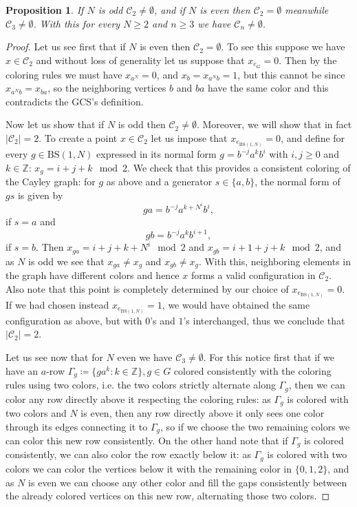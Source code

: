 \documentclass[letterpaper,10pt]{article}
\theoremstyle{plain}
\newtheorem{proposition}[theorem]{Proposition}
\newcommand{\BS}[1][N]{\mathrm{BS}(1,#1)}
\begin{document}
\begin{proposition}\label{prop.GCS_nonemptiness} If $N$ is odd $\mathcal{C}_2\neq \emptyset$, and if $N$ is even then $\mathcal{C}_2=\emptyset$ meanwhile $\mathcal{C}_3\neq \emptyset$. With this for every $N\ge 2$ and $n\ge 3$ we have $\mathcal{C}_n\neq \emptyset$.
\end{proposition}
\begin{proof}
	Let us see first that if $N$ is even then $\mathcal{C}_2=\emptyset$. To see this suppose we have $x\in \mathcal{C}_2$ and without loss of generality let us suppose that $x_{e_G}=0$. Then by the coloring rules we must have $x_{a^{N}}=0$, and $x_{b}=x_{a^Nb}=1$, but this cannot be since $x_{a^Nb}=x_{ba}$, so the neighboring vertices $b$ and $ba$ have the same color and this contradicts the GCS's definition.
	
	
	Now let us show that if $N$ is odd then $\mathcal{C}_2\neq \emptyset$. Moreover, we will show that in fact $|\mathcal{C}_2|=2$. To create a point $x\in \mathcal{C}_2$ let us impose that $x_{e_{\BS}}=0$, and define for every $g\in \BS$ expressed in its normal form $g=b^{-j}a^kb^i$ with $i,j\ge 0$ and $k\in \mathbb{Z}$: $x_g=i+j+k \mod 2$. We check that this provides a consistent coloring of the Cayley graph:
	for $g$ as above and a generator $s\in \{a,b\}$, the normal form of $gs$ is given by
	$$
	ga=b^{-j}a^{k+N^i}b^{i},
	$$
	if $s=a$ and 
	$$
	gb=b^{-j}a^{k}b^{i+1},
	$$
	if $s=b$.
	Then $x_{ga}=i+j+k+N^i \mod 2$ and $x_{gb}=i+1+j+k \mod 2$, and as $N$ is odd we see that $x_{ga}\neq x_g$ and $x_{gb}\neq x_g$. With this, neighboring elements in the graph have different colors and hence $x$ forms a valid configuration in $\mathcal{C}_2$. Also note that this point is completely determined by our choice of $x_{e_{\BS}}=0.$ If we had chosen instead $x_{e_{\BS}}=1$, we would have obtained the same configuration as above, but with $0$'s and $1$'s interchanged, thus we conclude that $|\mathcal{C}_2|=2$.
	
	
	Let us see now that for $N$ even we have $\mathcal{C}_3\neq\emptyset$. For this notice first that if we have an $a$-row $\Gamma_g\coloneqq\{ga^k: k\in \mathbb{Z}\}, g\in G$ colored consistently with the coloring rules using two colors, i.e. the two colors strictly alternate along $\Gamma_g$, then we can color any row directly above it respecting the coloring rules: as $\Gamma_g$ is colored with two colors and $N$ is even, then any row directly above it only sees one color through its edges connecting it to $\Gamma_g$, so if we choose the two remaining colors we can color this new row consistently. On the other hand note that if $\Gamma_g$ is colored consistently, we can also color the row exactly below it: as $\Gamma_g$ is colored with two colors we can color the vertices below it with the remaining color in $\{0,1,2\}$, and as $N$ is even we can choose any other color and fill the gaps consistently between the already colored vertices on this new row, alternating those two colors.
	

\end{proof}
\end{document}
